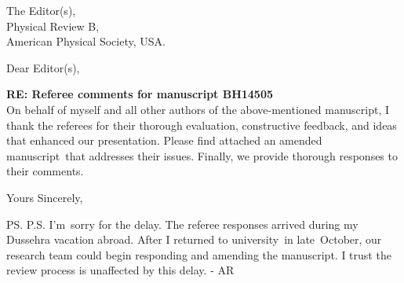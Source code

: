 \documentclass[a4paper, 10pt]{letter}
\begin{document}
	
	\begin{letter}
		{
			The Editor(s),\\
			Physical Review B,\\
			American Physical Society, USA.
		}
		
		\opening{Dear Editor(s),}
		\bigskip
		\textbf{RE: Referee comments for manuscript BH14505}
		\bigskip\noindent\\
	On behalf of myself and all other authors of the above-mentioned manuscript, I thank the referees for their thorough evaluation, constructive feedback, and ideas that enhanced our presentation. Please find attached an amended manuscript that addresses their issues. Finally, we provide thorough responses to their comments.	
		
		\closing{Yours Sincerely,}



\ps
P.S. I'm sorry for the delay. The referee responses arrived during my Dussehra vacation abroad. After I returned to university in late October, our research team could begin responding and amending the manuscript. I trust the review process is unaffected by this delay. - AR



		
	\end{letter}
\end{document}

